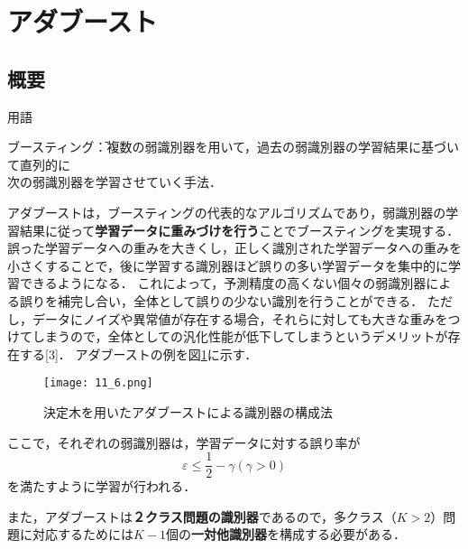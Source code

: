 \documentclass[dvipdfmx]{jreport}
\begin{document}
\section{アダブースト}
\subsection{概要}
\begin{itembox}[l]{\large{用語}}
    \begin{tabbing}
        \hspace{15pt} \raisebox{0.5ex}{\tiny $\bullet$} ブースティング\hspace{3pt}\=：複数の弱識別器を用いて，過去の弱識別器の学習結果に基づいて直列的に\\[0.5em]\>\hspace{6.5pt}次の弱識別器を学習させていく手法．
    \end{tabbing}
\end{itembox}

アダブーストは，ブースティングの代表的なアルゴリズムであり，弱識別器の学習結果に従って\textbf{学習データに重みづけを行う}ことでブースティングを実現する．
誤った学習データへの重みを大きくし，正しく識別された学習データへの重みを小さくすることで，後に学習する識別器ほど誤りの多い学習データを集中的に学習できるようになる．
これによって，予測精度の高くない個々の弱識別器による誤りを補完し合い，全体として誤りの少ない識別を行うことができる．
ただし，データにノイズや異常値が存在する場合，それらに対しても大きな重みをつけてしまうので，全体としての汎化性能が低下してしまうというデメリットが存在する[3]．
アダブーストの例を図\ref{fig:6}に示す．

\begin{figure}[h]
    \begin{center}
        \texttt{[image: 11\_6.png]}
        \caption{決定木を用いたアダブーストによる識別器の構成法}\label{fig:6}
    \end{center}
\end{figure}

ここで，それぞれの弱識別器は，学習データに対する誤り率が
\begin{equation}
    \varepsilon\leq \frac{1}{2} - \gamma (\gamma>0) \label{eq:24}
\end{equation}
を満たすように学習が行われる．

また，アダブーストは\textbf{２クラス問題の識別器}であるので，多クラス（$K > 2$）問題に対応するためには$K-1$個の\textbf{一対他識別器}を構成する必要がある．
\end{document}
